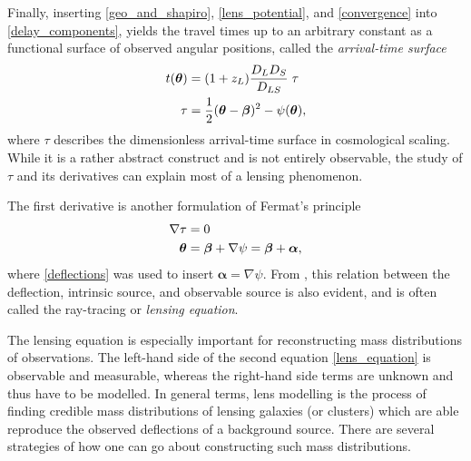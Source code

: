 Finally, inserting \eqref{geo_and_shapiro}, \eqref*{lens_potential}, and
\eqref*{convergence} into \eqref{delay_components}, yields the travel times up
to an arbitrary constant as a functional surface of observed angular positions,
called the \textit{arrival-time surface}
%
%
\begin{equation}\eqlbl{arrival_time_surface}%
  \begin{aligned}%
    t(\bm\theta) &= (1+z_{L})\frac{D_{L}D_{S}}{D_{LS}}\;\tau \\
    \tau &= \frac{1}{2}(\bm\theta-\bm\beta)^{2} - \psi(\bm\theta),
  \end{aligned}%
\end{equation}%
%
where $\tau$ describes the dimensionless arrival-time surface in cosmological
scaling. While it is a rather abstract construct and is not entirely observable, the study of
$\tau$ and its derivatives can explain most of a lensing phenomenon.

The first derivative is another formulation of Fermat's principle
%
\begin{equation}\eqlbl{lens_equation}%
  \begin{aligned}%
    \nabla\tau &= 0 \\
    \bm\theta &= \bm\beta + \nabla\psi = \bm\beta + \bm\alpha,
  \end{aligned}%
\end{equation}%
%
where \eqref{deflections} was used to insert $\bm\alpha = \nabla\psi$.  From
, this relation between the deflection, intrinsic source, and
observable source is also evident, and is often called the ray-tracing or
\textit{lensing equation}. 

The lensing equation is especially important for reconstructing mass
distributions of observations.  The left-hand side of the second equation
\eqref*{lens_equation} is observable and measurable, whereas the right-hand side
terms are unknown and thus have to be modelled.  In general terms, lens
modelling is the process of finding credible mass distributions of lensing
galaxies (or clusters) which are able reproduce the observed deflections of a
background source.  There are several strategies of how one can go about
constructing such mass distributions.  

